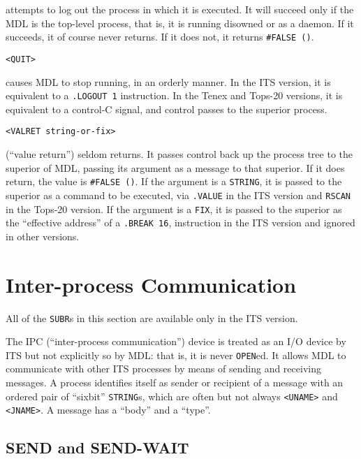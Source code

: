 \documentclass[a4paper]{scrbook}
\begin{document}
 attempts to log out the process in which it is executed. It will succeed only if the MDL is
the top-level process, that is, it is running disowned or as a daemon. If it succeeds, it of course never returns. If it
does not, it returns \texttt{\#FALSE\ ()}.

\begin{verbatim}
<QUIT>
\end{verbatim}

 causes MDL to stop running, in an orderly manner. In the ITS version, it is equivalent to a
\texttt{.LOGOUT\ 1} instruction. In the Tenex and Tops-20 versions, it is equivalent to a control-C signal, and control
passes to the superior process.

\begin{verbatim}
<VALRET string-or-fix>
\end{verbatim}

 (``value return'') seldom returns. It passes control back up the process tree to the
superior of MDL, passing its argument as a message to that superior. If it does return, the value is \texttt{\#FALSE\ ()}.
If the argument is a \texttt{STRING}, it is passed to the superior as a command to be executed, via \texttt{.VALUE} in the
ITS version and \texttt{RSCAN} in the Tops-20 version. If the argument is a \texttt{FIX}, it is passed to the superior as
the ``effective address'' of a \texttt{.BREAK\ 16}, instruction in the ITS version and ignored in other versions.

\section{Inter-process Communication}\label{inter-process-communication}

All of the \texttt{SUBR}s in this section are available only in the ITS version.

The IPC (``inter-process communication'') device is treated as an I/O device by ITS but not explicitly so by MDL: that is,
it is never \texttt{OPEN}ed. It allows MDL to communicate with other ITS processes by means of sending and receiving
messages. A process identifies itself as sender or recipient of a message with an ordered pair of ``sixbit''
\texttt{STRING}s, which are often but not always \texttt{\textless{}UNAME\textgreater{}} and
\texttt{\textless{}JNAME\textgreater{}}. A message has a ``body'' and a ``type''.

\subsection{SEND and SEND-WAIT}\label{send-and-send-wait}
\end{document}
